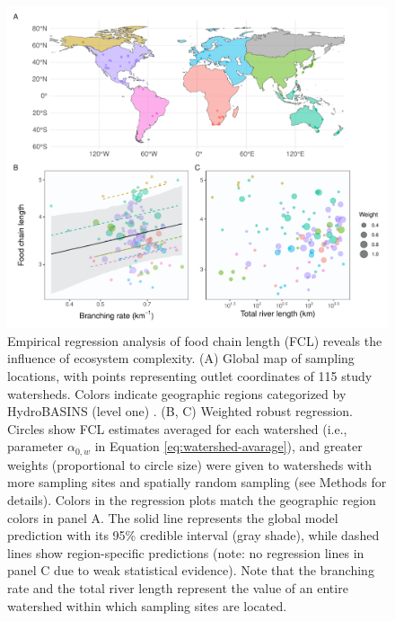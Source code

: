 \documentclass[11pt, class=article, crop=false]{standalone}
\begin{document}
\begin{figure}
    \centering
    \includegraphics[width=0.9\linewidth]{data_fmt/fig_emp_fcl.pdf}
    \caption{Empirical regression analysis of food chain length (FCL) reveals the influence of ecosystem complexity. (A) Global map of sampling locations, with points representing outlet coordinates of 115 study watersheds. Colors indicate geographic regions categorized by HydroBASINS (level one) \citep{lehner_global_2013}. (B, C) Weighted robust regression. Circles show FCL estimates averaged for each watershed (i.e., parameter $\alpha_{0,w}$ in Equation \ref{eq:watershed-avarage}), and greater weights (proportional to circle size) were given to watersheds with more sampling sites and spatially random sampling (see Methods for details). Colors in the regression plots match the geographic region colors in panel A. The solid line represents the global model prediction with its 95\% credible interval (gray shade), while dashed lines show region-specific predictions (note: no regression lines in panel C due to weak statistical evidence). Note that the branching rate and the total river length represent the value of an entire watershed within which sampling sites are located.}
    \label{fig:fcl-obs}
\end{figure}
\end{document}
